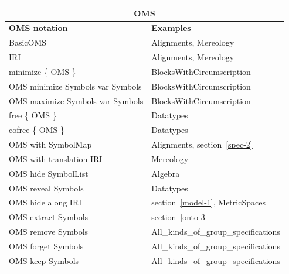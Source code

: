 \documentclass[10pt, a4paper]{isov2}
\begin{document}
\begin{tabular}{|l|l|}\hline
\multicolumn{2}{|c|}{\textbf{OMS}}\\\hline
\textbf{OMS notation} & \textbf{Examples} \\\hline
BasicOMS  & Alignments, Mereology \\\hline
IRI  & Alignments, Mereology \\\hline
minimize \{ OMS \}  & BlocksWithCircumscription \\\hline
OMS minimize Symbols var Symbols  & BlocksWithCircumscription \\\hline
OMS maximize Symbols var Symbols  & BlocksWithCircumscription \\\hline
free \{ OMS \} & Datatypes \\\hline
cofree \{ OMS \} & Datatypes \\\hline
OMS with SymbolMap  & Alignments,  section~\ref{spec-2} \\\hline
OMS with translation IRI  & Mereology \\\hline
OMS hide SymbolList  &  Algebra \\\hline
OMS reveal Symbols  & Datatypes \\\hline
OMS hide along IRI  & section~\ref{model-1}, MetricSpaces \\\hline
OMS extract Symbols  & section~\ref{onto-3} \\\hline
OMS remove Symbols  & All\_kinds\_of\_group\_specifications \\\hline
OMS forget Symbols  & All\_kinds\_of\_group\_specifications \\\hline
OMS keep Symbols  & All\_kinds\_of\_group\_specifications \\\hline

\end{tabular}
\end{document}
